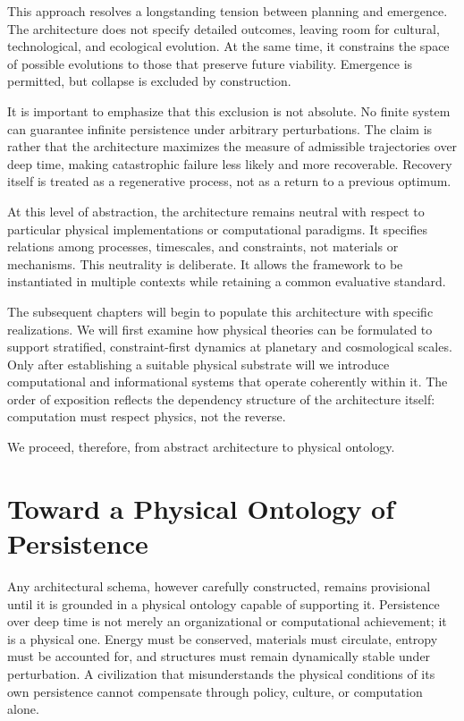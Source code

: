 \documentclass[12pt,oneside]{book}
\begin{document}
This approach resolves a longstanding tension between planning and emergence. The architecture does not specify detailed outcomes, leaving room for cultural, technological, and ecological evolution. At the same time, it constrains the space of possible evolutions to those that preserve future viability. Emergence is permitted, but collapse is excluded by construction.

It is important to emphasize that this exclusion is not absolute. No finite system can guarantee infinite persistence under arbitrary perturbations. The claim is rather that the architecture maximizes the measure of admissible trajectories over deep time, making catastrophic failure less likely and more recoverable. Recovery itself is treated as a regenerative process, not as a return to a previous optimum.

At this level of abstraction, the architecture remains neutral with respect to particular physical implementations or computational paradigms. It specifies relations among processes, timescales, and constraints, not materials or mechanisms. This neutrality is deliberate. It allows the framework to be instantiated in multiple contexts while retaining a common evaluative standard.

The subsequent chapters will begin to populate this architecture with specific realizations. We will first examine how physical theories can be formulated to support stratified, constraint-first dynamics at planetary and cosmological scales. Only after establishing a suitable physical substrate will we introduce computational and informational systems that operate coherently within it. The order of exposition reflects the dependency structure of the architecture itself: computation must respect physics, not the reverse.

We proceed, therefore, from abstract architecture to physical ontology.

\chapter{Toward a Physical Ontology of Persistence}

Any architectural schema, however carefully constructed, remains provisional until it is grounded in a physical ontology capable of supporting it. Persistence over deep time is not merely an organizational or computational achievement; it is a physical one. Energy must be conserved, materials must circulate, entropy must be accounted for, and structures must remain dynamically stable under perturbation. A civilization that misunderstands the physical conditions of its own persistence cannot compensate through policy, culture, or computation alone.
\end{document}
